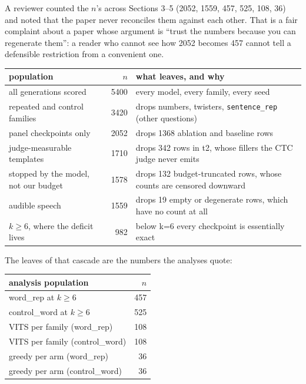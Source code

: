 \documentclass[11pt]{article}
\begin{document}
A reviewer counted the $n$'s across Sections 3--5 (2052, 1559, 457, 525, 108,
36) and noted that the paper never reconciles them against each other. That is
a fair complaint about a paper whose argument is ``trust the numbers because you
can regenerate them'': a reader who cannot see how 2052 becomes 457 cannot tell a
defensible restriction from a convenient one.

\begin{center}
\begin{tabular}{lrp{6.2cm}}
\toprule
population & $n$ & what leaves, and why \\
\midrule
all generations scored & 5400 & every model, every family, every seed \\
repeated and control families & 3420 & drops numbers, twisters, \texttt{sentence\_rep} (other questions) \\
panel checkpoints only & 2052 & drops 1368 ablation and baseline rows \\
judge-measurable templates & 1710 & drops 342 rows in t2, whose fillers the CTC judge never emits \\
stopped by the model, not our budget & 1578 & drops 132 budget-truncated rows, whose counts are censored downward \\
audible speech & 1559 & drops 19 empty or degenerate rows, which have no count at all \\
$k\ge6$, where the deficit lives & 982 & below k=6 every checkpoint is essentially exact \\
\bottomrule
\end{tabular}
\end{center}

\noindent The leaves of that cascade are the numbers the analyses quote:

\begin{center}
\begin{tabular}{lr}
\toprule
analysis population & $n$ \\
\midrule
word\_rep at $k\ge6$ & 457 \\
control\_word at $k\ge6$ & 525 \\
VITS per family (word\_rep) & 108 \\
VITS per family (control\_word) & 108 \\
greedy per arm (word\_rep) & 36 \\
greedy per arm (control\_word) & 36 \\
\bottomrule
\end{tabular}
\end{center}
\end{document}
